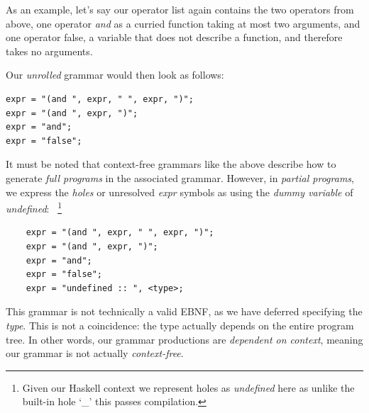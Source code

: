 \documentclass{article}
\begin{document}
As an example, let's say our operator list again contains the two operators from above,
one operator \emph{and} as a curried function taking at most two arguments,
and one operator false, a variable that does not describe a function,
and therefore takes no arguments.

Our \emph{unrolled} grammar would then look as follows:%
    


\begin{verbatim}
expr = "(and ", expr, " ", expr, ")";
expr = "(and ", expr, ")";
expr = "and";
expr = "false";
\end{verbatim}

It must be noted that context-free grammars like the above
describe how to generate \emph{full programs} in the associated grammar.
However,
in \emph{partial programs},
we express the \emph{holes} or unresolved \emph{expr} symbols as
using the \emph{dummy variable} of \emph{undefined}:%
~\footnote{
    Given our Haskell context we represent holes as \emph{undefined} here
    as unlike the built-in hole `\_' this passes compilation.
}

\begin{verbatim}
    expr = "(and ", expr, " ", expr, ")";
    expr = "(and ", expr, ")";
    expr = "and";
    expr = "false";
    expr = "undefined :: ", <type>;
\end{verbatim}

This grammar is not technically a valid EBNF,
as we have deferred specifying the \emph{type}.
This is not a coincidence: the type actually depends on the entire program tree.
In other words, our grammar productions are \emph{dependent on context},
meaning our grammar is not actually \emph{context-free}.
\end{document}
